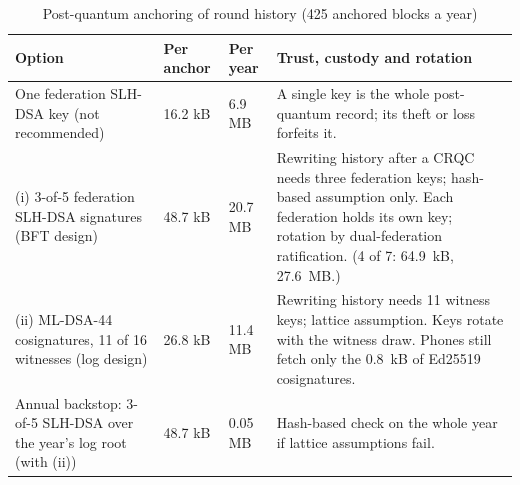 \documentclass[10pt,twoside,openany]{book}
\theoremstyle{dpepstyle}
\begin{document}
\begin{table}[htbp]
\centering
\caption{Post-quantum anchoring of round history (425 anchored blocks a year)}
\label{tab:anchors}
\scriptsize
\setlength{\tabcolsep}{3pt}
\begin{tabularx}{\textwidth}{L{1.05in} L{0.62in} L{0.45in} Y}
\toprule
\textbf{Option} & \textbf{Per anchor} & \textbf{Per year} & \textbf{Trust, custody and rotation} \\
\midrule
One federation SLH-DSA key (not recommended) & 16.2 kB & 6.9 MB & A single key is the whole post-quantum record; its theft or loss forfeits it. \\
(i) 3-of-5 federation SLH-DSA signatures (BFT design) & 48.7 kB & 20.7 MB & Rewriting history after a CRQC needs three federation keys; hash-based assumption only. Each federation holds its own key; rotation by dual-federation ratification. (4 of 7: 64.9~kB, 27.6~MB.) \\
(ii) ML-DSA-44 cosignatures, 11 of 16 witnesses (log design) & 26.8 kB & 11.4 MB & Rewriting history needs 11 witness keys; lattice assumption. Keys rotate with the witness draw. Phones still fetch only the 0.8~kB of Ed25519 cosignatures. \\
Annual backstop: 3-of-5 SLH-DSA over the year's log root (with (ii)) & 48.7 kB & 0.05 MB & Hash-based check on the whole year if lattice assumptions fail. \\
\bottomrule
\end{tabularx}
\par{}
\end{table}
\end{document}
